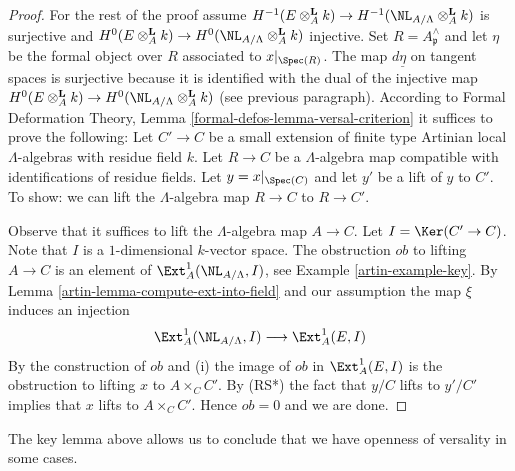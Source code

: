 \begin{proof}
\medskip\noindent
For the rest of the proof assume $H^{-1}(E \otimes_A^\mathbf{L} k) \to
H^{-1}(\NL_{A/\Lambda} \otimes_A^\mathbf{L} k)$
is surjective and
$H^0(E \otimes_A^\mathbf{L} k) \to
H^0(\NL_{A/\Lambda} \otimes_A^\mathbf{L} k)$
injective. Set $R = A_\mathfrak p^\wedge$ and let $\eta$ be the
formal object over $R$ associated to $x|_{\Spec(R)}$.
The map $d\underline{\eta}$ on tangent spaces is surjective
because it is identified with the dual of the injective map
$H^0(E \otimes_A^{\mathbf{L}} k) \to
H^0(\NL_{A/\Lambda} \otimes_A^{\mathbf{L}} k)$
(see previous paragraph). According to
Formal Deformation Theory, Lemma \ref{formal-defos-lemma-versal-criterion}
it suffices to prove the following:
Let $C' \to C$ be a small extension of finite type Artinian local
$\Lambda$-algebras with residue field $k$. Let $R \to C$ be a
$\Lambda$-algebra map compatible with identifications of residue fields.
Let $y = x|_{\Spec(C)}$ and let $y'$ be a lift of $y$ to $C'$.
To show: we can lift the $\Lambda$-algebra map $R \to C$ to $R \to C'$.

\medskip\noindent
Observe that it suffices to lift the $\Lambda$-algebra map $A \to C$.
Let $I = \Ker(C' \to C)$. Note that $I$ is a $1$-dimensional $k$-vector
space. The obstruction $ob$ to lifting $A \to C$ is an element of
$\Ext^1_A(\NL_{A/\Lambda}, I)$, see Example \ref{artin-example-key}.
By Lemma \ref{artin-lemma-compute-ext-into-field} and our assumption the map
$\xi$ induces an injection
$$
\Ext^1_A(\NL_{A/\Lambda}, I)
\longrightarrow
\Ext^1_A(E, I)
$$
By the construction of $ob$ and (i) the image of $ob$ in $\Ext^1_A(E, I)$
is the obstruction to lifting $x$ to $A \times_C C'$. By (RS*) the fact that
$y/C$ lifts to $y'/C'$ implies that $x$ lifts to $A \times_C C'$. Hence
$ob = 0$ and we are done.
\end{proof}

The key lemma above allows us to conclude that we have openness of
versality in some cases.

